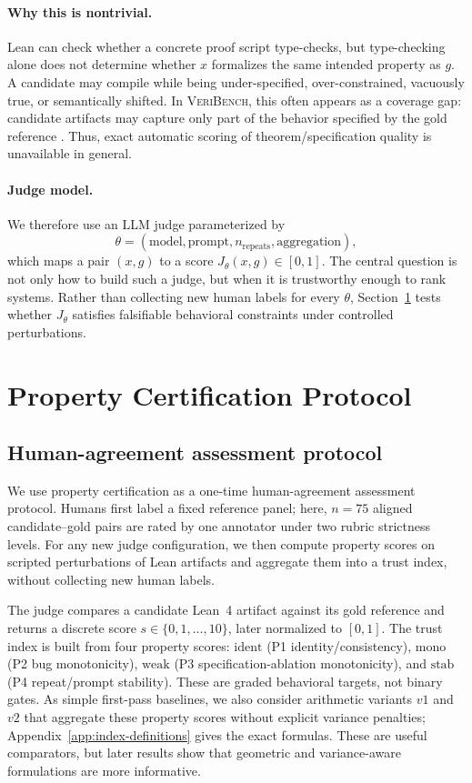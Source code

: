 \documentclass{article}
\begin{document}
\paragraph{Why this is nontrivial.}
Lean can check whether a concrete proof script type-checks, but type-checking alone does
not determine whether $x$ formalizes the same intended property as $g$. A candidate may
compile while being under-specified, over-constrained, vacuously true, or semantically
shifted. In \textsc{VeriBench}, this often appears as a coverage gap: candidate artifacts
may capture only part of the behavior specified by the gold reference
\citep{miranda2026veribench}. Thus, exact automatic scoring of theorem/specification quality is unavailable in
general.

\paragraph{Judge model.}
We therefore use an LLM judge parameterized by
\[
  \theta = (\text{model}, \text{prompt}, n_{\mathrm{repeats}}, \text{aggregation}),
\]
which maps a pair $(x,g)$ to a score $J_\theta(x,g)\in[0,1]$. The central question is not
only how to build such a judge, but when it is trustworthy enough to rank systems. Rather
than collecting new human labels for every $\theta$, Section~\ref{sec:property-protocol} tests whether $J_\theta$
satisfies falsifiable behavioral constraints under controlled perturbations.

\section{Property Certification Protocol}\label{sec:property-protocol}
\subsection{Human-agreement assessment protocol}
We use property certification as a one-time human-agreement assessment protocol. Humans first label a fixed reference panel; here, \(n=75\) aligned candidate--gold pairs are rated by one annotator under two rubric strictness levels. For any new judge configuration, we then compute property scores on scripted perturbations of Lean artifacts and aggregate them into a trust index, without collecting new human labels.

The judge compares a candidate Lean~4 artifact against its gold reference and returns a discrete score \(s\in\{0,1,\dots,10\}\), later normalized to \([0,1]\). The trust index is built from four property scores:
\(\text{ident}\) (P1 identity/consistency),
\(\text{mono}\) (P2 bug monotonicity),
\(\text{weak}\) (P3 specification-ablation monotonicity), and
\(\text{stab}\) (P4 repeat/prompt stability).
These are graded behavioral targets, not binary gates.
As simple first-pass baselines, we also consider arithmetic variants \(v1\) and \(v2\) that aggregate these property scores without explicit variance penalties; Appendix~\ref{app:index-definitions} gives the exact formulas. These are useful comparators, but later results show that geometric and variance-aware formulations are more informative.
\end{document}
